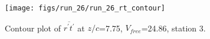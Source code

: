 \begin{figure}[H]
\centering
\texttt{[image: figs/run\_26/run\_26\_rt\_contour]}
\caption{Contour plot of $\overline{r^\prime t^\prime}$ at $z/c$=7.75, $V_{free}$=24.86, station 3.}
\label{fig:run_26_rt_contour}
\end{figure}



